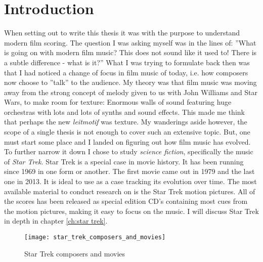 \chapter{Introduction}\label{ch:introduction}

When setting out to write this thesis it was with the purpose to understand modern film scoring. The question I was asking myself was in the lines of: ''What is going on with modern film music? This does not sound like it used to! There is a subtle difference - what is it?'' What I was trying to formulate back then was that I had noticed a change of focus in film music of today, i.e. how composers now choose to ''talk'' to the audience. My theory was that film music was moving away from the strong concept of melody given to us with John Williams and Star Wars, to make room for texture: Enormous walls of sound featuring huge orchestras with lots and lots of synths and sound effects. This made me think that perhaps the new \textit{leitmotif} was texture. My wanderings aside however, the scope of a single thesis is not enough to cover such an extensive topic. But, one must start some place and I landed on figuring out how film music has evolved. To further narrow it down I chose to study \textit{science fiction}, specifically the music of \textit{Star Trek}. Star Trek is a special case in movie history. It has been running since 1969 in one form or another. The first movie came out in 1979 and the last one in 2013. It is ideal to use as a case tracking its evolution over time. The most available material to conduct research on is the Star Trek motion pictures. All of the scores has been released as special edition CD's containing most cues from the motion pictures, making it easy to focus on the music. I will discuss Star Trek in depth in chapter \ref{ch:star trek}.

\begin{figure}
\texttt{[image: star\_trek\_composers\_and\_movies]}
	\caption{Star Trek composers and movies}
	\label{fg:st composers}
\end{figure}

